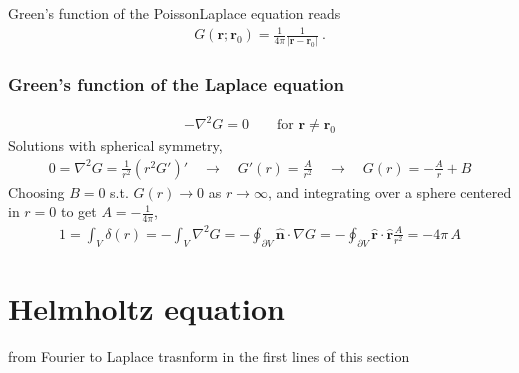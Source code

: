 \documentclass[letterpaper,10pt,english]{jupyterBook}
\begin{document}
\sphinxAtStartPar
Green’s function of the Poisson\sphinxhyphen{}Laplace equation reads
\begin{equation*}
\begin{split}G(\mathbf{r};\mathbf{r}_0) = \frac{1}{4 \pi} \frac{1}{\left| \mathbf{r}-\mathbf{r}_0 \right|} \ .\end{split}
\end{equation*}\subsubsection*{Green’s function of the Laplace equation}
\begin{equation*}
\begin{split}-\nabla^2 G = 0 \qquad \text{for $\mathbf{r} \ne \mathbf{r}_0$}\end{split}
\end{equation*}
\sphinxAtStartPar
Solutions with spherical symmetry,
\begin{equation*}
\begin{split}0 = \nabla^2 G = \frac{1}{r^2} \left( r^2 G' \right)'
\quad \rightarrow \quad
G'(r) = \frac{A}{r^2} \quad \rightarrow \quad G(r) = - \frac{A}{r} + B
\end{split}
\end{equation*}
\sphinxAtStartPar
Choosing \(B = 0\) s.t. \(G(r) \rightarrow 0\) as \(r \rightarrow \infty\), and integrating over a sphere centered in \(r=0\) to get \(A = -\frac{1}{4 \pi}\),
\begin{equation*}
\begin{split}1 = \int_{V} \delta(r) = - \int_{V} \nabla^2 G = - \oint_{\partial V} \hat{\mathbf{n}} \cdot \nabla G
= -\oint_{\partial V} \hat{\mathbf{r}} \cdot \hat{\mathbf{r}} \frac{A}{r^2} = - 4 \pi \, A \end{split}
\end{equation*}

\section{Helmholtz equation}
\label{\detokenize{ch/pde/bem-poisson-helmholtz-waves:helmholtz-equation}}\label{\detokenize{ch/pde/bem-poisson-helmholtz-waves:classical-electromagnetism-green-function-helmholtz}}
\sphinxAtStartPar
{} from Fourier to Laplace trasnform in the first lines of this section
\end{document}
